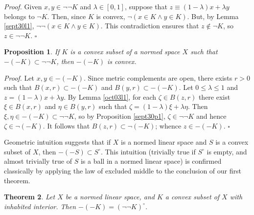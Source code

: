 \documentclass[11pt]{article}%
\newtheorem{theorem}{Theorem}
\newtheorem{proposition}[theorem]{Proposition}
\newenvironment{proof}[1][Proof]{\noindent\textit{#1.} }{}
\begin{document}
\begin{proof}
Given $x,y\in\lnot\lnot K$ and $\lambda\in\left[  0,1\right]  $, suppose that
$z\equiv\left(  1-\lambda\right)  x+\lambda y$ belongs to $\lnot K$. Then,
since $K$ is convex, $\lnot(x\in K\wedge y\in K)$. But, by Lemma
\ref{sept30l1}, $\lnot\lnot(x\in K\wedge y\in K)$. This contradiction ensures
that $z\notin\lnot K$, so $z\in\lnot\lnot K$.%
\hfill
$\square$
\end{proof}

\begin{proposition}
\label{oct01p1a}If $K$ is a convex subset of a normed space $X$ such that
$-(-K)\subset\lnot\lnot K$, then $-(-K)$ is convex.
\end{proposition}

\begin{proof}
Let $x,y\in-(-K)$. Since metric complements are open, there exists $r>0$ such
that $B(x,r)\subset-(-K)$ and $B(y,r)\subset-(-K)$. Let $0\leq\lambda\leq1$
and $z=(1-\lambda)x+\lambda y$. By Lemma \ref{oct03l1}, for each $\zeta\in
B(z,r)$ there exist $\xi\in B(x,r)$ and $\eta\in B(y,r)$ such that
$\zeta=\left(  1-\lambda\right)  \xi+\lambda\eta$. Then $\xi,\eta
\in-(-K)\subset\lnot\lnot K$, so by Proposition \ref{sept30p1}, $\zeta\in
\lnot\lnot K$ and hence $\zeta\in\lnot(-K)$. It follows that $B(z,r)\subset
\lnot(-K)$; whence $z\in-(-K)$.%
\hfill
$\square$
\end{proof}

%

\medskip
Geometric intuition suggests that if $X$ is a normed linear space and $S$ is a
convex subset of $X$, then $-(-S)\subset S^{\circ}$. This intuition (trivially
true if $S^{\circ}$ is empty, and almost trivially true of $S$ is a ball in a
normed linear space) is confirmed classically by applying the law of excluded
middle to the conclusion of our first theorem.

\begin{theorem}
\label{mar20t1}Let $X$ be a normed linear space, and $K$ a convex subset of
$X$ with inhabited interior. Then $-(-K)=\left(  \lnot\lnot K\right)  ^{\circ}
$.
\end{theorem}
\end{document}
